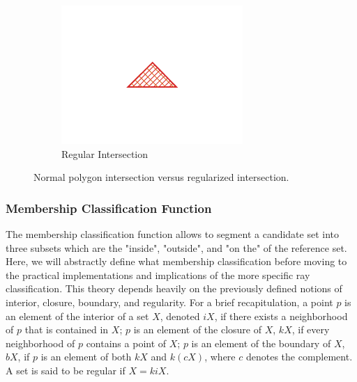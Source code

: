 \documentclass[a4paper,11pt,oneside]{article}
\begin{document}
\begin{figure}[ht]
     \hfill
     \begin{subfigure}[b]{0.3\textwidth}
         \centering
         \includegraphics[width=\textwidth]{section3/3.2/regularization-regular.png}
         \caption{Regular Intersection}
         \label{section3.2:regular-intersection}
     \end{subfigure}
        \caption{Normal polygon intersection versus regularized intersection.}
        \label{section3.2:regularity}
\end{figure}
   
\subsubsection{Membership Classification Function}
The membership classification function allows to segment a candidate set into three subsets which are the "inside", "outside", and "on the" of the reference set. Here, we will abstractly define what membership classification before moving to the practical implementations and implications of the more specific ray classification.
This theory depends heavily on the previously defined notions of interior, closure, boundary, and regularity. For a brief recapitulation, a point $p$ is an element of the interior of a set $X$, denoted $iX$, if there exists a neighborhood of $p$ that is contained in $X$; $p$ is an element of the closure of $X$, $kX$, if every neighborhood of $p$ contains a point of $X$; $p$ is an element of the boundary of $X$, $bX$, if $p$ is an element of both $kX$ and $k(cX)$, where $c$ denotes the complement. A set is said to be regular if $X = kiX$.
\end{document}
